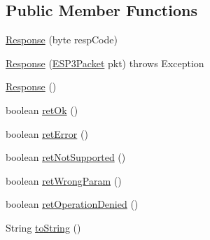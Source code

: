 \subsection*{Public Member Functions}
\begin{DoxyCompactItemize}
\item 
\hyperlink{classit_1_1polito_1_1elite_1_1enocean_1_1protocol_1_1serial_1_1v3_1_1network_1_1packet_1_1response_1_1_response_a383d898cbc2cabaa4fd6032ed19da446}{Response} (byte resp\+Code)
\item 
\hyperlink{classit_1_1polito_1_1elite_1_1enocean_1_1protocol_1_1serial_1_1v3_1_1network_1_1packet_1_1response_1_1_response_a20b54888495cbb91f2b05aebdbbc5bd2}{Response} (\hyperlink{classit_1_1polito_1_1elite_1_1enocean_1_1protocol_1_1serial_1_1v3_1_1network_1_1packet_1_1_e_s_p3_packet}{E\+S\+P3\+Packet} pkt)  throws Exception 	
\item 
\hyperlink{classit_1_1polito_1_1elite_1_1enocean_1_1protocol_1_1serial_1_1v3_1_1network_1_1packet_1_1response_1_1_response_afa17d523c4740189ab5468ca8d72ee10}{Response} ()
\item 
boolean \hyperlink{classit_1_1polito_1_1elite_1_1enocean_1_1protocol_1_1serial_1_1v3_1_1network_1_1packet_1_1response_1_1_response_a15cf819c24b693ff6786434f8a9a567a}{ret\+Ok} ()
\item 
boolean \hyperlink{classit_1_1polito_1_1elite_1_1enocean_1_1protocol_1_1serial_1_1v3_1_1network_1_1packet_1_1response_1_1_response_aaec6a63c8333032acabb8fce25722372}{ret\+Error} ()
\item 
boolean \hyperlink{classit_1_1polito_1_1elite_1_1enocean_1_1protocol_1_1serial_1_1v3_1_1network_1_1packet_1_1response_1_1_response_aab6cdfc62c90f9df3beb7981bd9501c7}{ret\+Not\+Supported} ()
\item 
boolean \hyperlink{classit_1_1polito_1_1elite_1_1enocean_1_1protocol_1_1serial_1_1v3_1_1network_1_1packet_1_1response_1_1_response_a73fe9c7775f90308c4f3cf35391e65c7}{ret\+Wrong\+Param} ()
\item 
boolean \hyperlink{classit_1_1polito_1_1elite_1_1enocean_1_1protocol_1_1serial_1_1v3_1_1network_1_1packet_1_1response_1_1_response_a61118f24ab43d027d480cb37f8654021}{ret\+Operation\+Denied} ()
\item 
String \hyperlink{classit_1_1polito_1_1elite_1_1enocean_1_1protocol_1_1serial_1_1v3_1_1network_1_1packet_1_1response_1_1_response_a5afe4d5053fd654535a12f6a8281c6cf}{to\+String} ()
\end{DoxyCompactItemize}

